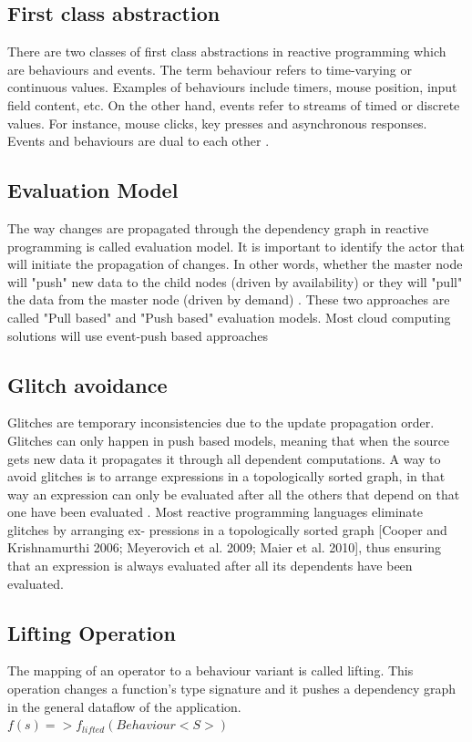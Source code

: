 \documentclass[12pt]{report}
\begin{document}
\subsection{First class abstraction}
There are two classes of first class abstractions in reactive programming which are behaviours and events.
The term behaviour refers to time-varying or continuous values. Examples of behaviours include timers, mouse position, input field content, etc. On the other hand, events refer to streams of timed or discrete values. For instance, mouse clicks, key presses and asynchronous responses. Events and behaviours are dual to each other \cite{BainomugishaEngineer2013Asor}.

\subsection{Evaluation Model}
The way changes are propagated through the dependency graph in reactive programming is called evaluation model. It is important to identify the actor that will initiate the propagation of changes. In other words, whether the master node will "push" new data to the child nodes (driven by availability) or they will "pull" the data from the master node (driven by demand) \cite{BainomugishaEngineer2013Asor}. These two approaches are called "Pull based" and "Push based" evaluation models. Most cloud computing solutions will use event-push based approaches

\subsection{Glitch avoidance}
Glitches are temporary inconsistencies due to the update propagation order. Glitches can only happen in push based models, meaning that when the source gets new data it propagates it through all dependent computations.  A way to avoid glitches is to arrange expressions in a topologically sorted graph, in that way an expression can only be evaluated after all the others that depend on that one have been evaluated \cite{BainomugishaEngineer2013Asor}.
Most reactive programming languages eliminate glitches by arranging ex- pressions in a topologically sorted graph [Cooper and Krishnamurthi 2006; Meyerovich et al. 2009; Maier et al. 2010], thus ensuring that an expression is always evaluated after all its dependents have been evaluated.

\subsection{Lifting Operation}
The mapping of an operator to a behaviour variant is called lifting. This operation changes a function's type signature and it pushes a dependency graph in the general dataflow of the application.
$f(s) => f_{lifted}(Behaviour<S>)$
\end{document}

